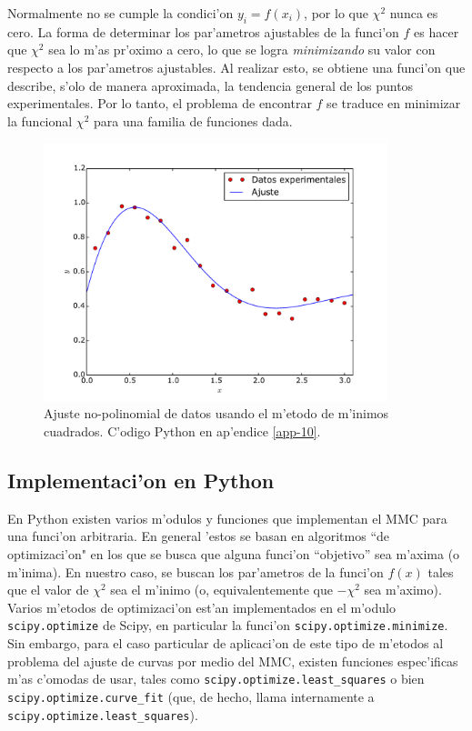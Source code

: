 Normalmente no se cumple la condici'on $y_i = f(x_i)$, por lo que $\chi^2$ nunca es cero. La forma de determinar los par'ametros ajustables de la funci'on $f$ es hacer que $\chi^2$ sea lo m'as pr'oximo a cero, lo que se logra \textit{minimizando} su valor con respecto a los par'ametros ajustables. Al realizar esto, se obtiene una funci'on que describe, s'olo de manera aproximada, la tendencia general de los puntos experimentales.
Por lo tanto, el problema de encontrar $f$ se traduce en minimizar la funcional $\chi^2$ para una familia de funciones dada. 
\begin{figure}[h!]
\begin{center}
\includegraphics[width=10cm]{figs/fig-mmc-2.pdf}
\caption{Ajuste no-polinomial de datos usando el m'etodo de m'inimos cuadrados. C'odigo Python en ap'endice \ref{app-10}.}
\end{center}
\label{fig-mmc-2}
\end{figure}
\subsection{Implementaci'on en Python}
En Python existen varios m'odulos y funciones que implementan el MMC para una funci'on arbitraria. En general 'estos se basan en algoritmos ``de optimizaci'on" en los que se busca que alguna funci'on ``objetivo'' sea m'axima (o m'inima). En nuestro caso, se buscan los par'ametros de la funci'on $f(x)$ tales que el valor de $\chi^2$ sea el m'inimo (o, equivalentemente que $-\chi^2$ sea m'aximo). Varios m'etodos de optimizaci'on est'an implementados en el m'odulo \texttt{scipy.optimize} de Scipy, en particular la funci'on \texttt{scipy.optimize.minimize}. Sin embargo, para el caso particular de aplicaci'on de este tipo de m'etodos al problema del ajuste de curvas por medio del MMC, existen funciones espec'ificas m'as c'omodas de usar, tales como \texttt{scipy.optimize.least\_squares} o bien \texttt{scipy.optimize.curve\_fit} (que, de hecho, llama internamente a \texttt{scipy.optimize.least\_squares}).


